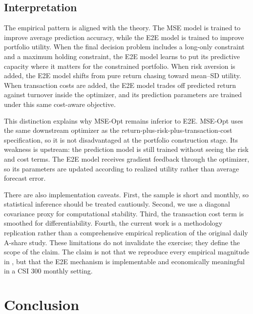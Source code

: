 \documentclass[11pt]{article}
\begin{document}
\subsection{Interpretation}

The empirical pattern is aligned with the theory. The MSE model is trained to improve average prediction accuracy, while the E2E model is trained to improve portfolio utility. When the final decision problem includes a long-only constraint and a maximum holding constraint, the E2E model learns to put its predictive capacity where it matters for the constrained portfolio. When risk aversion is added, the E2E model shifts from pure return chasing toward mean--SD utility. When transaction costs are added, the E2E model trades off predicted return against turnover inside the optimizer, and its prediction parameters are trained under this same cost-aware objective.

This distinction explains why MSE-Opt remains inferior to E2E. MSE-Opt uses the same downstream optimizer as the return-plus-risk-plus-transaction-cost specification, so it is not disadvantaged at the portfolio construction stage. Its weakness is upstream: the prediction model is still trained without seeing the risk and cost terms. The E2E model receives gradient feedback through the optimizer, so its parameters are updated according to realized utility rather than average forecast error.

There are also implementation caveats. First, the sample is short and monthly, so statistical inference should be treated cautiously. Second, we use a diagonal covariance proxy for computational stability. Third, the transaction cost term is smoothed for differentiability. Fourth, the current work is a methodology replication rather than a comprehensive empirical replication of the original daily A-share study. These limitations do not invalidate the exercise; they define the scope of the claim. The claim is not that we reproduce every empirical magnitude in \citet{wang2026mlmm}, but that the E2E mechanism is implementable and economically meaningful in a CSI 300 monthly setting.

\section{Conclusion}
\end{document}

